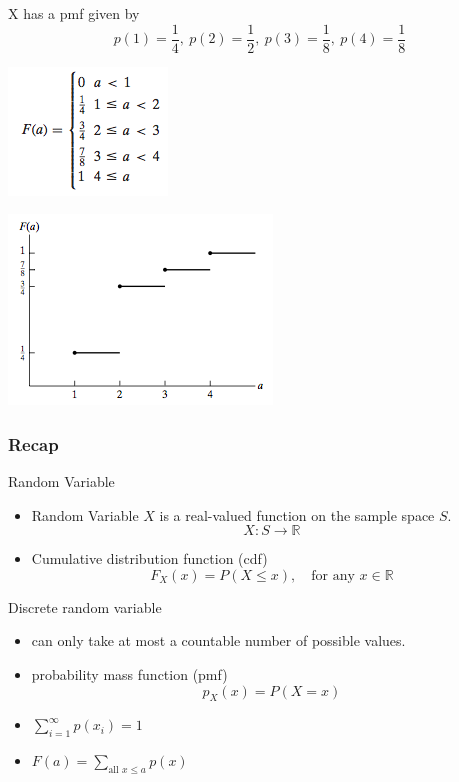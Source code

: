 \documentclass[slidestop,compress,mathserif]{beamer}
\begin{document}
\begin{frame}%
X has a pmf given by
\[p(1) = \frac{1}{4},\ p(2) = \frac{1}{2},\ p(3) = \frac{1}{8},\ p(4) = \frac{1}{8} \]

{
\pause
\begin{center}
\includegraphics[scale = 0.8]{figures/eg_cdf}
\end{center}
}
{
\pause
\begin{center}
\includegraphics[scale = 0.75]{figures/eg_cdf2}
\end{center}
}


\end{frame}

\begin{frame}\frametitle{Recap}

Random Variable
\begin{itemize}
\item Random Variable $X$ is a real-valued  function on the sample space $S$.
\[ X: S \longrightarrow \mathbb{R}\]

\item Cumulative distribution function (cdf)
\[ F_X(x) = P(X \leq x), \quad \text{for any } x \in \mathbb{R} \]
\end{itemize}

\pause
Discrete random variable
\begin{itemize}
\item can only take at most a countable number of possible values.
\item probability mass function (pmf)
\[ p_X(x) = P(X = x) \]
\end{itemize}
\pause
\vspace{-0.3cm}
{
\begin{itemize}
\item $\sum_{i=1}^{\infty} p(x_i) = 1$
\end{itemize}
}
{
\begin{itemize}
\item $F(a) = \sum_{\text{all } x \leq a} p(x)$
\end{itemize}
}



\end{frame}
\end{document}
